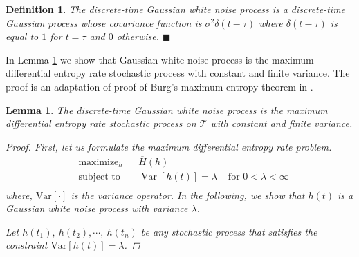 \documentclass{article}
\DeclareMathOperator*{\maximize}{maximize}
\DeclareMathOperator*{\subj}{subject \  to}
\DeclareMathOperator*{\var}{Var}
\newtheorem{mydef}{Definition}
\newtheorem{lem}{Lemma}
\begin{document}
\begin{mydef}
The discrete-time Gaussian white noise process is a
discrete-time Gaussian process whose covariance function is
$\sigma^2\delta(t-\tau)$ \cite{Vantrees}  where $\delta (t-\tau)$ is
equal to $1$ for $t=\tau$ and $0$ otherwise. \hfill $\blacksquare$


\end{mydef}

In Lemma \ref{lem:WGN} we show that Gaussian white noise
process is the maximum differential entropy rate stochastic process
with constant and finite variance. The proof is an adaptation of
proof of Burg's maximum entropy theorem in \cite{Cover}.
\begin{lem}
\label{lem:WGN} The discrete-time Gaussian white noise
process is the maximum differential entropy rate stochastic process
on $\mathcal{T}$ with constant and finite variance.
\begin{proof}
First, let us formulate the  maximum differential entropy rate
problem.
\begin{equation}
 \begin{aligned}
 & \maximize_h
 & &  \overline{H}(h)\\
 & \subj
 & & \var[h(t)]=\lambda & \mbox{ for } 0<\lambda<\infty \\
 \end{aligned}
\end{equation}
where, $\text{Var}[\cdot]$ is the variance operator. In the
following, we show that $h(t)$ is a Gaussian white noise process
with variance $\lambda$.

Let $h(t_1),\ h(t_2), \cdots, \ h(t_n)$ be any stochastic process that  satisfies the constraint $\text{Var}[h(t)]=\lambda$.


\end{proof}
\end{lem}
\end{document}
